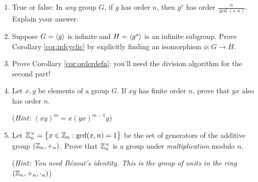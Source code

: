 \begin{exercises}
\begin{enumerate}
  \item True or false: In \emph{any} group $G$, if $g$ has order $n$, then $g^s$ has order $\frac n{\gcd(s,n)}$. Explain your answer.
  
  \item Suppose $G=\left\langle g\right\rangle$ is infinite and $H=\left\langle g^s\right\rangle$ is an infinite subgroup. Prove Corollary \ref{cor:infcyclic} by explicitly finding an isomorphism $\phi:G\to H$.

  \item Prove Corollary \ref{cor:orderdefn}: you'll need the division algorithm for the second part!
  
	\item Let $x,y$ be elements of a group $G$. If $xy$ has finite order $n$, prove that $yx$ also has order $n$.\par
	(\emph{Hint: $(xy)^m=x(yx)^{m-1}y$})
	
	\item\label{exs:znmult} Let $\mathbb{Z}_n^\times=\bigl\{x\in\mathbb{Z}_n:\gcd(x,n)=1\bigr\}$ be the set of generators of the additive group $(\mathbb{Z}_n,+_n)$. Prove that $\mathbb{Z}_n^\times$ is a group under \emph{multiplication} modulo $n$.\par
	(\emph{Hint: You need Bézout's identity. This is the group of units in the ring $(\mathbb{Z}_n,+_n,\cdot_n)$})
	
%   
	

\end{enumerate}
\end{exercises}
